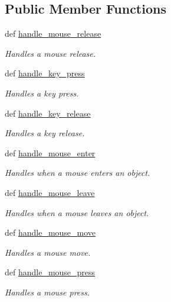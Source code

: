 \subsection*{Public Member Functions}
\begin{DoxyCompactItemize}
\item 
def \hyperlink{classsample_1_1Remover_a84484de500f08402e582c126432e0cf1}{handle\_\-mouse\_\-release}
\begin{DoxyCompactList}\small\item\em Handles a mouse release. \item\end{DoxyCompactList}\item 
def \hyperlink{classcs110graphics_1_1EventHandler_af3fb3531d0b23f1430a830586cd07906}{handle\_\-key\_\-press}
\begin{DoxyCompactList}\small\item\em Handles a key press. \item\end{DoxyCompactList}\item 
def \hyperlink{classcs110graphics_1_1EventHandler_a2849f60251baa44252992162521f2473}{handle\_\-key\_\-release}
\begin{DoxyCompactList}\small\item\em Handles a key release. \item\end{DoxyCompactList}\item 
def \hyperlink{classcs110graphics_1_1EventHandler_a13af3268f8a1aa36b8483eb2deffef15}{handle\_\-mouse\_\-enter}
\begin{DoxyCompactList}\small\item\em Handles when a mouse enters an object. \item\end{DoxyCompactList}\item 
def \hyperlink{classcs110graphics_1_1EventHandler_a5deaf2b6b8055e97ac0ddf6603132c64}{handle\_\-mouse\_\-leave}
\begin{DoxyCompactList}\small\item\em Handles when a mouse leaves an object. \item\end{DoxyCompactList}\item 
def \hyperlink{classcs110graphics_1_1EventHandler_a521fdcd170d15c0b8baa124c78b6d1ef}{handle\_\-mouse\_\-move}
\begin{DoxyCompactList}\small\item\em Handles a mouse move. \item\end{DoxyCompactList}\item 
def \hyperlink{classcs110graphics_1_1EventHandler_a547873123ebcd3fcc63a2e03d2a2fee3}{handle\_\-mouse\_\-press}
\begin{DoxyCompactList}\small\item\em Handles a mouse press. \item\end{DoxyCompactList}\end{DoxyCompactItemize}


